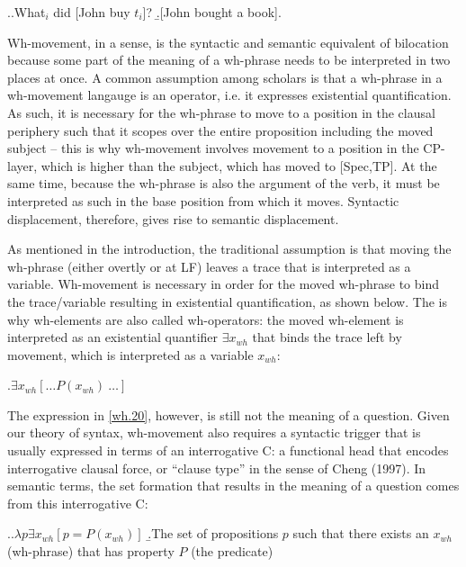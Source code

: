 \documentclass{glossa}
\begin{document}
\ex.\label{wh.10}\a.\label{2.10a}What$_i$ did [John buy $t_i$]?
	\b.\label{2.10b}[John bought a book].

Wh-movement, in a sense, is the syntactic and semantic equivalent of bilocation because some part of the meaning of a wh-phrase needs to be interpreted in two places at once. A common assumption among scholars is that a wh-phrase in a wh-movement langauge is an operator, i.e. it expresses existential quantification. As such, it is necessary for the wh-phrase to move to a position in the clausal periphery such that it scopes over the entire proposition including the moved subject -- this is why wh-movement involves movement to a position in the CP-layer, which is higher than the subject, which has moved to [Spec,TP]. At the same time, because the wh-phrase is also the argument of the verb, it must be interpreted as such in the base position from which it moves. Syntactic displacement, therefore, gives rise to semantic displacement.

As mentioned in the introduction, the traditional assumption is that moving the wh-phrase (either overtly or at LF) leaves a trace that is interpreted as a variable. Wh-movement is necessary in order for the moved wh-phrase to bind the trace/variable resulting in existential quantification, as shown below. The is why wh-elements are also called wh-operators: the moved wh-element is interpreted as an existential quantifier $\exists x_{wh}$ that binds the trace left by movement, which is interpreted as a variable $x_{wh}$:

\ex.\label{wh.20}$\exists x_{wh}[\dots P(x_{wh})\ \dots]$

The expression in \ref{wh.20}, however, is still not the meaning of a question. Given our theory of syntax, wh-movement also requires a syntactic trigger that is usually expressed in terms of an interrogative C: a functional head that encodes interrogative clausal force, or ``clause type'' in the sense of Cheng (1997). In semantic terms, the set formation that results in the meaning of a question comes from this interrogative C:

\ex.\label{wh.30}\a.$\lambda p\exists x_{wh}[p = P(x_{wh})]$
   \b.The set of propositions $p$ such that there exists an $x_{wh}$ (wh-phrase) that has property $P$ (the predicate)
\end{document}
